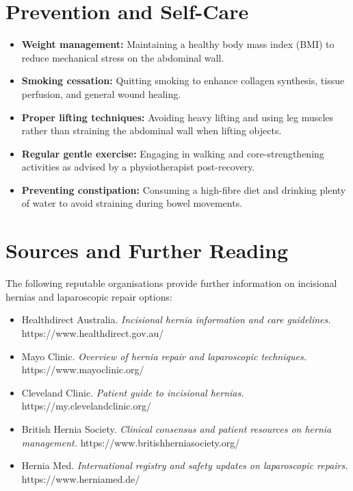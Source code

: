 \section*{Prevention and Self-Care}
\begin{itemize}
    \item \textbf{Weight management:} Maintaining a healthy body mass index (BMI) to reduce mechanical stress on the abdominal wall.
    \item \textbf{Smoking cessation:} Quitting smoking to enhance collagen synthesis, tissue perfusion, and general wound healing.
    \item \textbf{Proper lifting techniques:} Avoiding heavy lifting and using leg muscles rather than straining the abdominal wall when lifting objects.
    \item \textbf{Regular gentle exercise:} Engaging in walking and core-strengthening activities as advised by a physiotherapist post-recovery.
    \item \textbf{Preventing constipation:} Consuming a high-fibre diet and drinking plenty of water to avoid straining during bowel movements.
\end{itemize}

\section*{Sources and Further Reading}
The following reputable organisations provide further information on incisional hernias and laparoscopic repair options:
\begin{itemize}
    \item Healthdirect Australia. \textit{Incisional hernia information and care guidelines.} https://www.healthdirect.gov.au/
    \item Mayo Clinic. \textit{Overview of hernia repair and laparoscopic techniques.} https://www.mayoclinic.org/
    \item Cleveland Clinic. \textit{Patient guide to incisional hernias.} https://my.clevelandclinic.org/
    \item British Hernia Society. \textit{Clinical consensus and patient resources on hernia management.} https://www.britishherniasociety.org/
    \item Hernia Med. \textit{International registry and safety updates on laparoscopic repairs.} https://www.herniamed.de/
\end{itemize}
